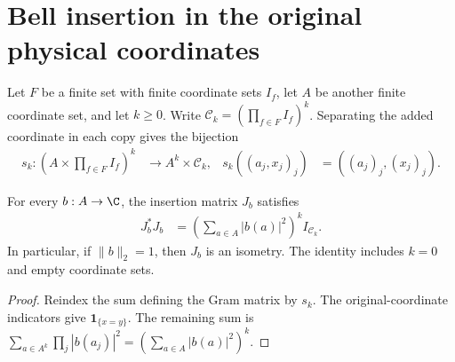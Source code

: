 \section{Bell insertion in the original physical coordinates}

\begin{definition}
    \label{def:added_site_copy_separation}
    \leanok
    Let $F$ be a finite set with finite coordinate sets $I_f$, let $A$
    be another finite coordinate set, and let $k\geq0$.
    Write $\mathcal C_k=(\prod_{f\in F}I_f)^k$.
    Separating the added coordinate in each copy gives the bijection
    \begin{align*}
        s_k:\left(A\times\prod_{f\in F}I_f\right)^k
        &\longrightarrow A^k\times\mathcal C_k,
        &
        s_k((a_j,x_j)_j)&=((a_j)_j,(x_j)_j).
    \end{align*}
\end{definition}

\begin{theorem}
    \label{thm:added_site_insertion_gram}
    \leanok
    For every $b:A\to\C$, the insertion matrix $J_b$ satisfies
    \begin{align*}
        J_b^*J_b
        &=\left(\sum_{a\in A}|b(a)|^2\right)^k I_{\mathcal C_k}.
    \end{align*}
    In particular, if $\|b\|_2=1$, then $J_b$ is an isometry.
    The identity includes $k=0$ and empty coordinate sets.
\end{theorem}
\begin{proof}\leanok
    Reindex the sum defining the Gram matrix by $s_k$.
    The original-coordinate indicators give $\mathbf1_{\{x=y\}}$.
    The remaining sum is
    $\sum_{a\in A^k}\prod_j|b(a_j)|^2
      =(\sum_{a\in A}|b(a)|^2)^k$.
\end{proof}


